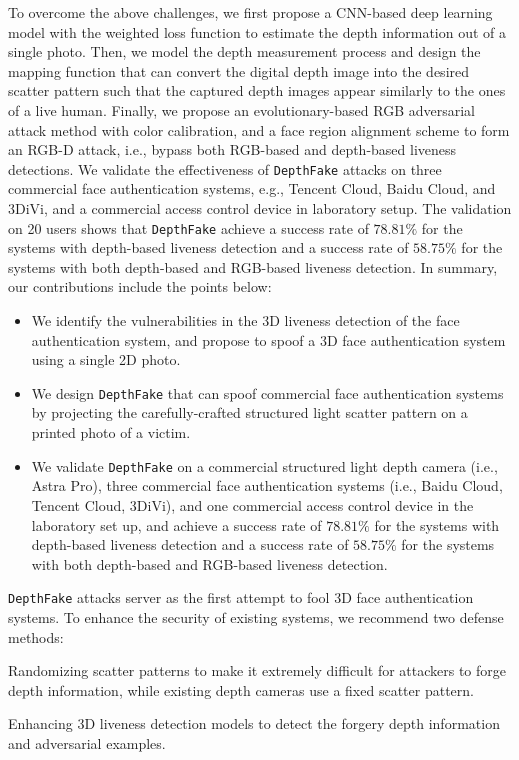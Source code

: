 To overcome the above challenges, we first propose a CNN-based deep learning model with the weighted loss function to estimate the depth information out of a single photo.
Then, we model the depth measurement process and design the mapping function that can convert the digital depth image into the desired scatter pattern such that the captured depth images appear similarly to the ones of a live human. 
Finally, we propose an evolutionary-based RGB adversarial attack method with color calibration, and a face region alignment scheme to form an RGB-D attack, i.e., bypass both RGB-based and depth-based liveness detections.
We validate the effectiveness of \texttt{DepthFake} attacks on three commercial face authentication systems, e.g., Tencent Cloud, Baidu Cloud, and 3DiVi, and a commercial access control device in laboratory setup. The validation on 20 users shows that \texttt{DepthFake} achieve a success rate of $78.81\%$ for the systems with depth-based liveness detection and a success rate of $58.75\%$ for the systems with both depth-based and RGB-based liveness detection. In summary, our contributions include the points below:
\begin{itemize}	
	\item We identify the vulnerabilities in the 3D liveness detection of the face authentication system, and propose to spoof a 3D  face authentication system using a single 2D photo.	
	\item We design \texttt{DepthFake} that can spoof commercial face authentication systems by projecting the carefully-crafted structured light scatter pattern on a printed photo of a victim.	
	\item We validate \texttt{DepthFake} on a commercial structured light depth camera (i.e., Astra Pro), three commercial face authentication systems (i.e., Baidu Cloud, Tencent Cloud, 3DiVi), and one commercial access control device in the laboratory set up, and achieve a success rate of $78.81\%$ for the systems with depth-based liveness detection and a success rate of $58.75\%$ for the systems with both depth-based and RGB-based liveness detection.
\end{itemize}

\texttt{DepthFake} attacks server as the first attempt to fool 3D face authentication systems. To enhance the security of existing systems, we recommend two defense methods:
\begin{inparaenum}
\item Randomizing scatter patterns to make it extremely difficult for attackers to forge depth information, while existing depth cameras use a fixed scatter pattern.
\item  Enhancing 3D liveness detection models to detect the forgery depth information and adversarial examples.
\end{inparaenum}


